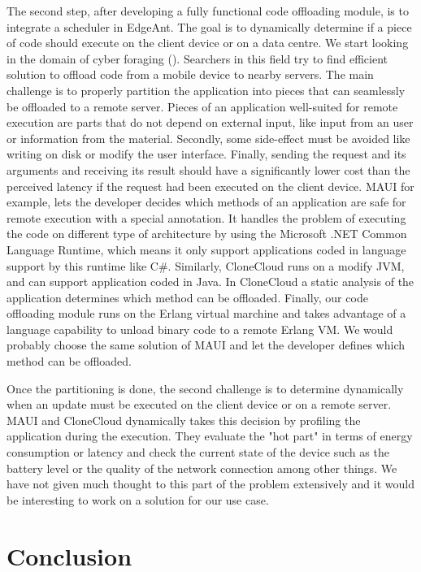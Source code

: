 \documentclass[11pt]{article}
\begin{document}
The second step, after developing a fully functional code offloading module,
is to integrate a scheduler in EdgeAnt. The goal is to dynamically determine
if a piece of code should execute on the client device or on a data centre. We
start looking in the domain of cyber foraging (\cite{Cyberforaging2017}).
Searchers in this field try to find efficient solution to offload code from a
mobile device to nearby servers. The main challenge is to properly partition
the application into pieces that can seamlessly be offloaded to a remote
server. Pieces of an application well-suited for remote execution are parts
that do not depend on external input, like input from an user or information
from the material. Secondly, some side-effect must be avoided like writing on
disk or modify the user interface. Finally, sending the request and its
arguments and receiving its result should have a significantly lower cost than
the perceived latency if the request had been executed on the client device.
MAUI \cite{MAUI:2010} for example, lets the developer decides which methods of
an application are safe for remote execution with a special annotation. It
handles the problem of executing the code on different type of architecture by
using the Microsoft .NET Common Language Runtime, which means it only support
applications coded in language support by this runtime like C\#. Similarly,
CloneCloud\cite{CloneCloud:2011} runs on a modify JVM, and can support
application coded in Java. In CloneCloud a static analysis of the application
determines which method can be offloaded. Finally, our code offloading module
runs on the Erlang virtual marchine and takes advantage of a language
capability to unload binary code to a remote Erlang VM. We would probably
choose the same solution of MAUI and let the developer defines which method
can be offloaded.

Once the partitioning is done, the second challenge is to determine
dynamically when an update must be executed on the client device or on a
remote server. MAUI and CloneCloud dynamically takes this decision by
profiling the application during the execution. They evaluate the "hot part"
in terms of energy consumption or latency and check the current state of the
device such as the battery level or the quality of the network connection
among other things. We have not given much thought to this part of the problem
extensively and it would be interesting to work on a solution for our use
case.




\section{Conclusion}
\end{document}
